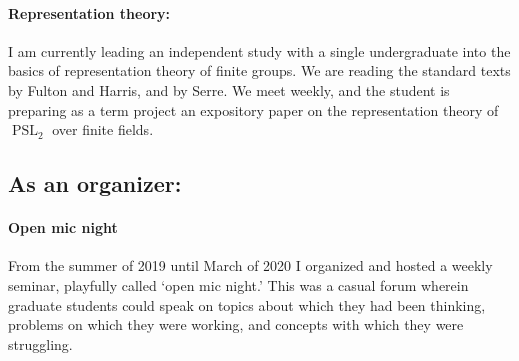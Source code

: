 \documentclass[12pt]{article}
\begin{document}
\paragraph{Representation theory:} I am currently leading an independent study with a single undergraduate into the basics of representation theory of finite groups. We are reading the standard texts by Fulton and Harris, and by Serre. We meet weekly, and the student is preparing as a term project an expository paper on the representation theory of $\operatorname{PSL}_2$ over finite fields.

\subsection*{As an organizer:}
\paragraph{Open mic night} From the summer of 2019 until March of 2020 I organized and hosted a weekly seminar, playfully called `open mic night.' This was a casual forum wherein graduate students could speak on topics about which they had been thinking, problems on which they were working, and concepts with which they were struggling. 
\end{document}
